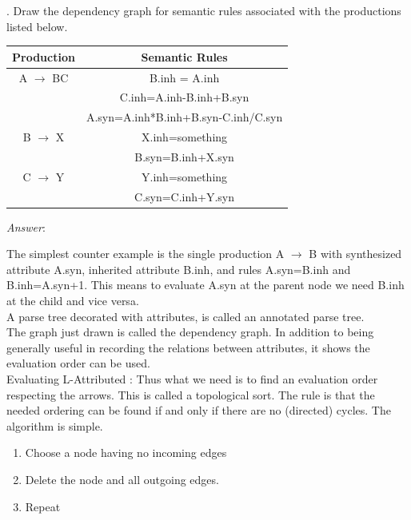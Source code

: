 \documentclass[a4paper,12pt]{article}
\begin{document}
. Draw the dependency graph for semantic rules associated with the productions listed below.
\begin{center}
\begin{tabular}{|c|c|}
\hline
Production &  Semantic Rules\\
\hline
A $\longrightarrow$ BC & B.inh = A.inh\\
&C.inh=A.inh-B.inh+B.syn\\
&A.syn=A.inh*B.inh+B.syn-C.inh/C.syn\\
\hline
B $\longrightarrow$ X &X.inh=something\\
& B.syn=B.inh+X.syn\\
\hline
C $\longrightarrow$ Y & Y.inh=something\\
& C.syn=C.inh+Y.syn\\
\hline
\end{tabular}
\end{center}
\emph{Answer}:

The simplest counter example is the single production A $\rightarrow$ B with synthesized attribute A.syn, inherited attribute B.inh, and rules A.syn=B.inh and B.inh=A.syn+1. This means to evaluate A.syn at the parent node we need B.inh at the child and vice versa.\\
A parse tree decorated with attributes, is called an annotated parse tree.\\
The graph just drawn is called the dependency graph. In addition to being generally useful in recording the relations between attributes, it shows the evaluation order can be used. \\
Evaluating L-Attributed :
Thus what we need is to find an evaluation order respecting the arrows. This is called a topological sort. The rule is that the needed ordering can be found if and only if there are no (directed) cycles. The algorithm is simple.
\begin{enumerate}
\item Choose a node having no incoming edges
\item Delete the node and all outgoing edges.
\item Repeat
\end{enumerate}
\end{document}
